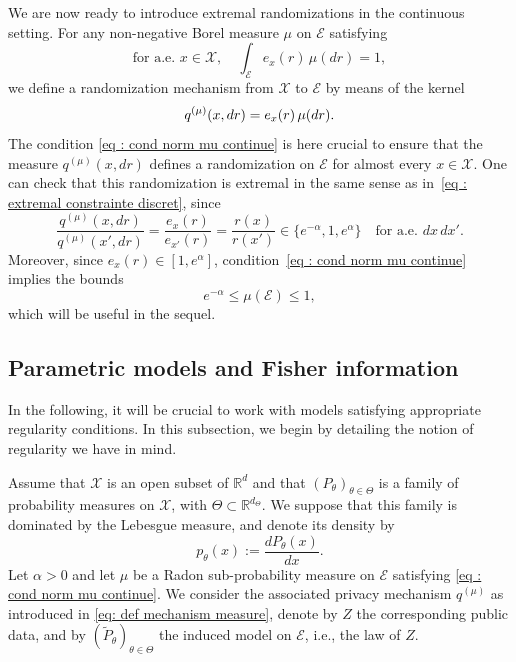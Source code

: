 \documentclass[a4paper, 11pt]{article}
\theoremstyle{definition}
\newcommand{\modar}{\color{black}}
\begin{document}
{We are now ready to introduce extremal randomizations in the continuous setting. For any non-negative Borel measure $\mu$ on $\mathcal{E}$ satisfying
\begin{equation} \label{eq : cond norm mu continue}
    \text{for a.e.\ } x \in \mathcal{X}, \quad \int_{\mathcal{E}} e_x(r) \, \mu(dr) = 1,
\end{equation}
we define a randomization mechanism from $\mathcal{X}$ to $\mathcal{E}$ by means of the kernel
\begin{equation}{\label{eq: def mechanism measure}}
    q^{(\mu)}(x,dr) = e_x(r) \, \mu(dr).
\end{equation}
{\modar The condition \eqref{eq : cond norm mu continue} is here crucial to ensure that the measure $q^{(\mu)}(x,dr)$ defines a randomization
	on $\mathcal{E}$ for almost every $x\in\mathcal{X}$.}
	One can check that this randomization is extremal in the same sense as in~\eqref{eq : extremal constrainte discret}, since
\[
\frac{q^{(\mu)}(x,dr)}{q^{(\mu)}(x',dr)} 
= \frac{e_x(r)}{e_{x'}(r)} 
= \frac{r(x)}{r(x')} \in \{ e^{-\alpha}, 1, e^{\alpha} \}
\quad \text{for a.e.\ } dx \, dx'.
\]
Moreover, since $e_x(r) \in [1, e^\alpha]$, condition~\eqref{eq : cond norm mu continue} implies the bounds
\begin{equation}\label{eq: bound mu E}
    e^{-\alpha} \le \mu(\mathcal{E}) \le 1,
\end{equation}
which will be useful in the sequel.


\subsection{Parametric models and Fisher information}
In the following, it will be crucial to work with models satisfying appropriate regularity conditions. In this subsection, we begin by detailing the notion of regularity we have in mind.  

Assume that $\mathcal{X}$ is an open subset of $\mathbb{R}^d$ and that $(P_{\theta})_{\theta \in \Theta}$ is a family of probability measures on $\mathcal{X}$, with $\Theta \subset \mathbb{R}^{d_\Theta}$. We suppose that this family is dominated by the Lebesgue measure, and denote its density by
\[
p_{\theta}(x) := \frac{dP_\theta(x)}{dx}.
\]
Let $\alpha > 0$ and let $\mu$ be a Radon sub-probability measure on $\mathcal{E}$ satisfying \eqref{eq : cond norm mu continue}. We consider the associated privacy mechanism $q^{(\mu)}$ as introduced in \eqref{eq: def mechanism measure}, denote by $Z$ the corresponding public data, and by $(\widetilde{P}_{\theta})_{\theta \in \Theta}$ the induced model on $\mathcal{E}$, i.e., the law of $Z$.  

}
\end{document}
